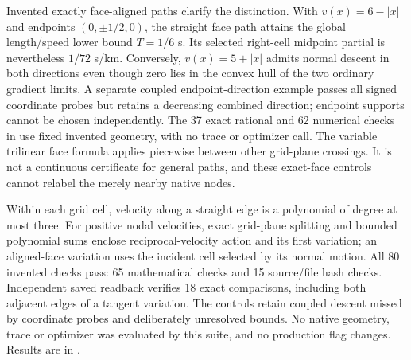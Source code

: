 Invented exactly face-aligned paths clarify the distinction. With
$v(x)=6-|x|$ and endpoints $(0,\pm1/2,0)$, the straight face path attains
the global length/speed lower bound $T=1/6$ s. Its selected right-cell
midpoint partial is nevertheless $1/72$ s/km. Conversely,
$v(x)=5+|x|$ admits normal descent in both directions even though zero lies
in the convex hull of the two ordinary gradient limits. A separate coupled
endpoint-direction example passes all signed coordinate probes but retains
a decreasing combined direction; endpoint supports cannot be chosen
independently. The 37 exact rational and 62 numerical checks in
use fixed invented geometry, with no trace or optimizer call. The variable
trilinear face formula applies piecewise between other grid-plane crossings.
It is not a continuous certificate for general paths, and these exact-face
controls cannot relabel the merely nearby native nodes.

Within each grid cell, velocity along a straight edge is a polynomial of
degree at most three. For positive nodal velocities, exact grid-plane splitting
and bounded polynomial sums enclose reciprocal-velocity action and its first variation; an
aligned-face variation uses the incident cell selected by its normal motion.
All 80 invented checks pass: 65 mathematical checks and 15 source/file hash
checks. Independent saved readback verifies 18 exact comparisons, including
both adjacent edges of a tangent variation. The controls retain coupled
descent missed by coordinate probes and deliberately unresolved bounds.
No native geometry, trace or optimizer was evaluated by this suite, and no
production flag changes. Results are in
.

